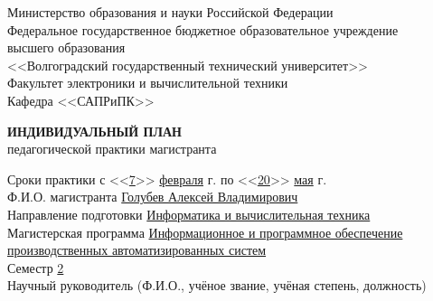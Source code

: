 \documentclass[a4paper, 14pt]{extreport}
\begin{document}
    \onehalfspacing
    \begin{titlepage}
        \begin{center}
            Министерство образования и науки Российской Федерации\\
            Федеральное государственное бюджетное образовательное учреждение\\
            высшего образования\\
            <<Волгоградский государственный технический университет>>\\
            Факультет электроники и вычислительной техники\\
            Кафедра <<САПРиПК>>
        \end{center}
        \vspace{2cm}
        \begin{center}
            \large \textbf{ИНДИВИДУАЛЬНЫЙ ПЛАН} \\
            педагогической практики магистранта
        \end{center}
        \vspace{2cm}
        Сроки практики с <<\underline{\hspace{1em}7\hspace{1em}}>> \underline{\hspace{1em}февраля\hspace{1em}} \the\year г. 
        по <<\underline{\hspace{1em}20\hspace{1em}}>> \underline{\hspace{1em}мая\hspace{1em}} \the\year г.\\
        Ф.И.О. магистранта \underline{Голубев Алексей Владимирович\hspace{10.7em}} \\
        Направление подготовки \underline{Информатика и вычислительная техника\hspace{4.2em}} \\
        Магистерская программа \underline{Информационное и программное обеспечение\hspace{2.1em}}\\
        \underline{производственных автоматизированных систем\hspace{13.3em}} \\
        Семестр \underline{\hspace{1cm}2\hspace{1cm}} \\

        \noindent Научный руководитель (Ф.И.О., учёное звание, учёная степень, должность)\\
        \underline{\hspace{\textwidth}}\\
        \underline{\hspace{\textwidth}}\\
        \underline{\hspace{\textwidth}}
    \end{titlepage}
\end{document}
